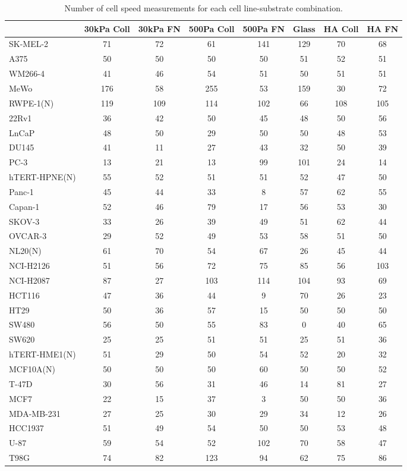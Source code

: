 \begin{table}[!h]
\centering
\caption{\label{tab:count-motility}Number of cell speed measurements for each cell line-substrate combination.}
\centering
\begin{tabular}[t]{lccccccc}
\toprule
  & 30kPa Coll & 30kPa FN & 500Pa Coll & 500Pa FN & Glass & HA Coll & HA FN\\
\midrule
SK-MEL-2 & 71 & 72 & 61 & 141 & 129 & 70 & 68\\
A375 & 50 & 50 & 50 & 50 & 51 & 52 & 51\\
WM266-4 & 41 & 46 & 54 & 51 & 50 & 51 & 51\\
MeWo & 176 & 58 & 255 & 53 & 159 & 30 & 72\\
RWPE-1(N) & 119 & 109 & 114 & 102 & 66 & 108 & 105\\
22Rv1 & 36 & 42 & 50 & 45 & 48 & 50 & 56\\
LnCaP & 48 & 50 & 29 & 50 & 50 & 48 & 53\\
DU145 & 41 & 11 & 27 & 43 & 32 & 50 & 39\\
PC-3 & 13 & 21 & 13 & 99 & 101 & 24 & 14\\
hTERT-HPNE(N) & 55 & 52 & 51 & 51 & 52 & 47 & 50\\
Panc-1 & 45 & 44 & 33 & 8 & 57 & 62 & 55\\
Capan-1 & 52 & 46 & 79 & 17 & 56 & 53 & 30\\
SKOV-3 & 33 & 26 & 39 & 49 & 51 & 62 & 44\\
OVCAR-3 & 29 & 52 & 49 & 53 & 58 & 51 & 50\\
NL20(N) & 61 & 70 & 54 & 67 & 26 & 45 & 44\\
NCI-H2126 & 51 & 56 & 72 & 75 & 85 & 56 & 103\\
NCI-H2087 & 87 & 27 & 103 & 114 & 104 & 93 & 69\\
HCT116 & 47 & 36 & 44 & 9 & 70 & 26 & 23\\
HT29 & 50 & 36 & 57 & 15 & 50 & 50 & 50\\
SW480 & 56 & 50 & 55 & 83 & 0 & 40 & 65\\
SW620 & 25 & 25 & 51 & 51 & 25 & 51 & 36\\
hTERT-HME1(N) & 51 & 29 & 50 & 54 & 52 & 20 & 32\\
MCF10A(N) & 50 & 50 & 50 & 60 & 50 & 50 & 52\\
T-47D & 30 & 56 & 31 & 46 & 14 & 81 & 27\\
MCF7 & 22 & 15 & 37 & 3 & 50 & 50 & 36\\
MDA-MB-231 & 27 & 25 & 30 & 29 & 34 & 12 & 26\\
HCC1937 & 51 & 49 & 54 & 50 & 50 & 53 & 48\\
U-87 & 59 & 54 & 52 & 102 & 70 & 58 & 47\\
T98G & 74 & 82 & 123 & 94 & 62 & 75 & 86\\
\bottomrule
\end{tabular}
\end{table}
